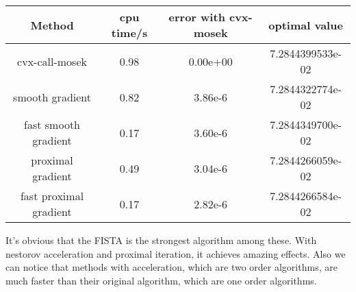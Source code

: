 \documentclass[11pt, oneside]{article}   	%
\begin{document}
\begin{table}[h]
  \centering
  \begin{tabular}{c|ccc}
  \hline
  Method&cpu time/s&error with cvx-mosek&optimal value\\
  \hline
  cvx-call-mosek&0.98&0.00e+00&7.2844399533e-02\\
  smooth gradient&0.82&3.86e-6&7.2844322774e-02\\
  fast smooth gradient&0.17&3.60e-6&7.2844349700e-02\\
  proximal gradient&0.49&3.04e-6&7.2844266059e-02\\
  fast proximal gradient&0.17&2.82e-6&7.2844266584e-02\\
  \hline
  \end{tabular}
\end{table}
It's obvious that the FISTA is the strongest algorithm among these. With nestorov acceleration and proximal iteration, it achieves amazing effects. Also we can notice that methods with acceleration, which are two order algorithms, are much faster than their original algorithm, which are one order algorithms.
\end{document}
